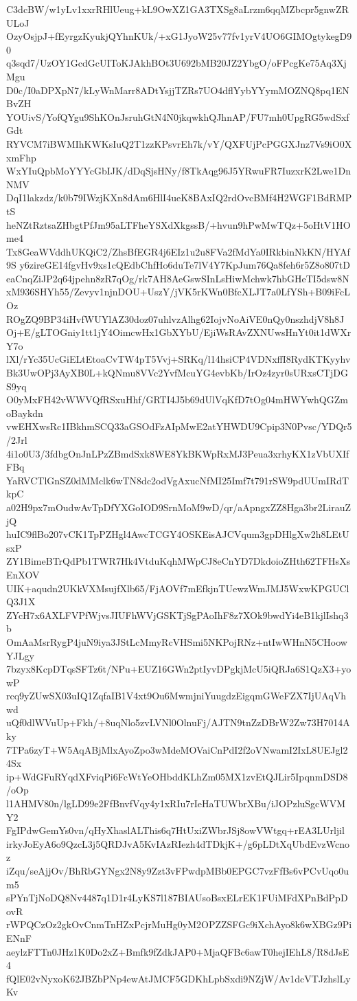 C3dcBW/w1yLv1xxrRHlUeug+kL9OwXZ1GA3TXSg8aLrzm6qqMZbcpr5gnwZRULoJ
OzyOsjpJ+fEyrgzKyukjQYhnKUk/+xG1JyoW25v77fv1yrV4UO6GIMOgtykegD90
q3sqd7/UzOY1GcdGcUIToKJAkhBOt3U692bMB20JZ2YbgO/oFPcgKe75Aq3XjMgu
D0c/I0aDPXpN7/kLyWnMarr8ADtYsjjTZRs7UO4dflYybYYymMOZNQ8pq1ENBvZH
YOUivS/YofQYgu9ShKOnJsruhGtN4N0jkqwkhQJhnAP/FU7mh0UpgRG5wdSxfGdt
RYVCM7iBWMIhKWKsIuQ2T1zzKPsvrEh7k/vY/QXFUjPcPGGXJnz7Vs9iO0XxmFhp
WxYIuQpbMoYYYcGbIJK/dDqSjsHNy/f8TkAqg96J5YRwuFR7IuzxrK2Lwe1DnNMV
DqI1lakzdz/k0b79IWzjKXn8dAm6HlI4ueK8BAxIQ2rdOvcBMf4H2WGF1BdRMPtS
heNZtRztsaZHbgtPfJm95aLTFheYSXdXkgssB/+hvun9hPwMwTQz+5oHtV1HOme4
Tx8GeaWVddhUKQiC2/ZhsBfEGR4j6EIz1u2u8FVa2fMdYa0IRkbinNkKN/HYAf9S
y6zireGE14fgvHv9xs1cQEdbChfHo6duTe7lV4Y7KpJum76Qa8feh6r5Z8o807tD
eaCnqZiJP2q64jpehn8zR7qOg/rk7AH8AeGswSInLsHiwMchwk7hbGHeTI5dsw8N
xM936SHYh55/Zevyv1njnDOU+UszY/jVK5rKWn0BfcXLJT7a0LfYSh+B09iFcLOz
ROgZQ9BP34iHvfWUYlAZ30doz07uhlvzAlhg62IojvNoAiVE0nQy0nszhdjV8h8J
Oj+E/gLTOGniy1tt1jY4OimcwHx1GbXYbU/EjiWsRAvZXNUwsHnYt0it1dWXrY7o
lXl/rYc35UcGiELtEtoaCvTW4pT5Vvj+SRKq/l14hsiCP4VDNxffI8RydKTKyyhv
Bk3UwOPj3AyXB0L+kQNmu8VVc2YvfMcuYG4evbKb/IrOz4zyr0sURxsCTjDGS9yq
O0yMxFH42vWWVQfRSxuHhf/GRTI4J5b69dUlVqKfD7tOg04mHWYwhQGZmoBaykdn
vwEHXwsRc1IBkhmSCQ33aGSOdFzAIpMwE2atYHWDU9Cpip3N0Pvsc/YDQr5/2Jrl
4i1o0U3/3fdbgOnJnLPzZBmdSxk8WE8YkBKWpRxMJ3Peua3xrhyKX1zVbUXIfFBq
YaRVCTlGnSZ0dMMclk6wTN8dc2odVgAxucNfMI25Imf7t791rSW9pdUUmIRdTkpC
a02H9px7mOudwAvTpDfYXGoIOD9SrnMoM9wD/qr/aApngxZZ8Hga3br2LirauZjQ
huIC9flBo207vCK1TpPZHgl4AwcTCGY4OSKEisAJCVqum3gpDHlgXw2h8LEtUsxP
ZY1BimeBTrQdPb1TWR7Hk4VtduKqhMWpCJ8eCnYD7DkdoioZHth62TFHsXsEnXOV
UIK+aqudn2UKkVXMsujfXlb65/FjAOVf7mEfkjnTUewzWmJMJ5WxwKPGUClQ3J1X
ZYcH7x6AXLFVPfWjvsJIUFhWVjGSKTjSgPAoIhF8z7XOk9bwdYi4eB1kjlIshq3b
OmAaMsrRygP4juN9iya3JStLcMmyRcVHSmi5NKPojRNz+ntIwWHnN5CHoowYJLgy
7bzyx8KcpDTqsSFTz6t/NPu+EUZ16GWn2ptIyvDPgkjMcU5iQRJa6S1QzX3+yowP
rcq9yZUwSX03uIQ1ZqfaIB1V4xt9Ou6MwmjniYuugdzEigqmGWeFZX7IjUAqVhwd
uQf0dlWVuUp+Fkh/+8uqNlo5zvLVNl0OlnuFj/AJTN9tnZzDBrW2Zw73H7014Aky
7TPa6zyT+W5AqABjMlxAyoZpo3wMdeMOVaiCnPdI2f2oVNwamI2IxL8UEJgl24Sx
ip+WdGFuRYqdXFviqPi6FcWtYeOHbddKLhZm05MX1zvEtQJLir5IpqnmDSD8/oOp
l1AHMV80n/lgLD99e2FfBnvfVqy4y1xRIu7rIeHaTUWbrXBu/iJOPzluSgcWVMY2
FgIPdwGemYs0vn/qHyXhaslALThis6q7HtUxiZWbrJSj8owVWtgq+rEA3LUrljil
irkyJoEyA6o9QzcL3j5QRDJvA5KvIAzRIezh4dTDkjK+/g6pLDtXqUbdEvzWcnoz
iZqu/seAjjOv/BhRbGYNgx2N8y9Zzt3vFPwdpMBb0EPGC7vzFfBs6vPCvUqo0um5
sPYnTjNoDQ8Nv4487q1D1r4LyKS7l187BIAUsoBsxELrEK1FUiMFdXPnBdPpDovR
rWPQCzOz2gkOvCnmTnHZxPcjrMuHg0yM2OPZZSFGc9iXchAyo8k6wXBGz9PiENnF
aeylzFTTn0JHz1K0Do2xZ+Bmfk9fZdkJAP0+MjaQFBc6awT0hejIEhL8/R8dJsE4
fQlE02vNyxoK62JBZbPNp4ewAtJMCF5GDKhLpbSxdi9NZjW/Av1dcVTJzhslLyKv
